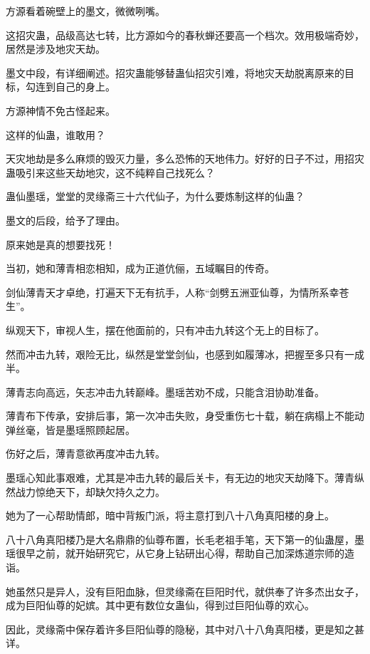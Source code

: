 
\begin{this_body}



方源看着碗壁上的墨文，微微咧嘴。

这招灾蛊，品级高达七转，比方源如今的春秋蝉还要高一个档次。效用极端奇妙，居然是涉及地灾天劫。

墨文中段，有详细阐述。招灾蛊能够替蛊仙招灾引难，将地灾天劫脱离原来的目标，勾连到自己的身上。

方源神情不免古怪起来。

这样的仙蛊，谁敢用？

天灾地劫是多么麻烦的毁灭力量，多么恐怖的天地伟力。好好的日子不过，用招灾蛊吸引来这些天劫地灾，这不纯粹自己找死么？

蛊仙墨瑶，堂堂的灵缘斋三十六代仙子，为什么要炼制这样的仙蛊？

墨文的后段，给予了理由。

原来她是真的想要找死！

当初，她和薄青相恋相知，成为正道伉俪，五域瞩目的传奇。

剑仙薄青天才卓绝，打遍天下无有抗手，人称“剑劈五洲亚仙尊，为情所系幸苍生”。

纵观天下，审视人生，摆在他面前的，只有冲击九转这个无上的目标了。

然而冲击九转，艰险无比，纵然是堂堂剑仙，也感到如履薄冰，把握至多只有一成半。

薄青志向高远，矢志冲击九转巅峰。墨瑶苦劝不成，只能含泪协助准备。

薄青布下传承，安排后事，第一次冲击失败，身受重伤七十载，躺在病榻上不能动弹丝毫，皆是墨瑶照顾起居。

伤好之后，薄青意欲再度冲击九转。

墨瑶心知此事艰难，尤其是冲击九转的最后关卡，有无边的地灾天劫降下。薄青纵然战力惊绝天下，却缺欠持久之力。

她为了一心帮助情郎，暗中背叛门派，将主意打到八十八角真阳楼的身上。

八十八角真阳楼乃是大名鼎鼎的仙尊布置，长毛老祖手笔，天下第一的仙蛊屋，墨瑶很早之前，就开始研究它，从它身上钻研出心得，帮助自己加深炼道宗师的造诣。

她虽然只是异人，没有巨阳血脉，但灵缘斋在巨阳时代，就供奉了许多杰出女子，成为巨阳仙尊的妃嫔。其中更有数位女蛊仙，得到过巨阳仙尊的欢心。

因此，灵缘斋中保存着许多巨阳仙尊的隐秘，其中对八十八角真阳楼，更是知之甚详。


\end{this_body}
